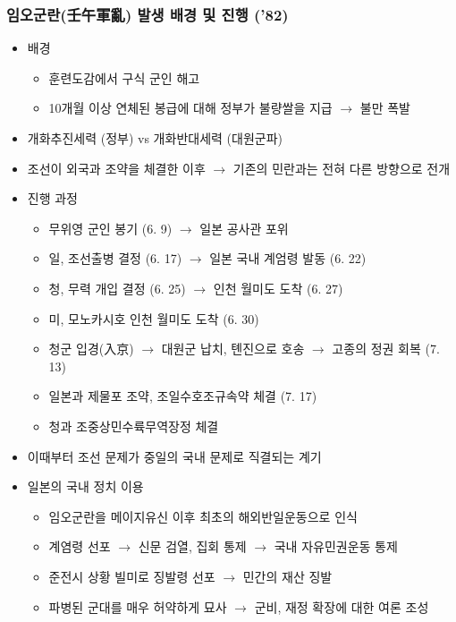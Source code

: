 \subsubsection*{임오군란(壬午軍亂) 발생 배경 및 진행 ('82)}
\begin{itemize}
    \item 배경
    \begin{itemize}
        \item 훈련도감에서 구식 군인 해고
        \item 10개월 이상 연체된 봉급에 대해 정부가 불량쌀을 지급 $\rightarrow$ 불만 폭발
    \end{itemize}
    \item 개화추진세력 (정부) vs 개화반대세력 (대원군파)
    \item 조선이 외국과 조약을 체결한 이후 $\rightarrow$ 기존의 민란과는 전혀 다른 방향으로 전개
    \item 진행 과정
    \begin{itemize}
        \item 무위영 군인 봉기 (6. 9) $\rightarrow$ 일본 공사관 포위
        \item 일, 조선출병 결정 (6. 17) $\rightarrow$ 일본 국내 계엄령 발동 (6. 22)
        \item 청, 무력 개입 결정 (6. 25) $\rightarrow$ 인천 월미도 도착 (6. 27)
        \item 미, 모노카시호 인천 월미도 도착 (6. 30)
        \item 청군 입경(入京) $\rightarrow$ 대원군 납치, 톈진으로 호송 $\rightarrow$ 고종의 정권 회복 (7. 13)
        \item 일본과 제물포 조약, 조일수호조규속약 체결 (7. 17)
        \item 청과 조중상민수륙무역장정 체결
    \end{itemize}
    \item 이때부터 조선 문제가 중일의 국내 문제로 직결되는 계기
    \item 일본의 국내 정치 이용
    \begin{itemize}
        \item 임오군란을 메이지유신 이후 최초의 해외반일운동으로 인식
        \item 계염령 선포 $\rightarrow$ 신문 검열, 집회 통제 $\rightarrow$ 국내 자유민권운동 통제
        \item 준전시 상황 빌미로 징발령 선포 $\rightarrow$ 민간의 재산 징발
        \item 파병된 군대를 매우 허약하게 묘사 $\rightarrow$ 군비, 재정 확장에 대한 여론 조성
    \end{itemize}
\end{itemize}

